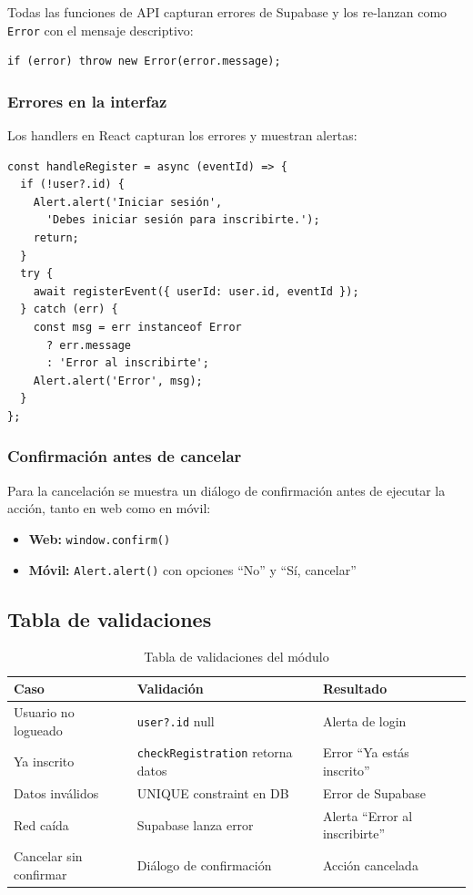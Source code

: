 Todas las funciones de API capturan errores de Supabase y los
re-lanzan como \texttt{Error} con el mensaje descriptivo:

\begin{verbatim}
if (error) throw new Error(error.message);
\end{verbatim}

\subsubsection*{Errores en la interfaz}

Los handlers en React capturan los errores y muestran alertas:

\begin{verbatim}
const handleRegister = async (eventId) => {
  if (!user?.id) {
    Alert.alert('Iniciar sesión',
      'Debes iniciar sesión para inscribirte.');
    return;
  }
  try {
    await registerEvent({ userId: user.id, eventId });
  } catch (err) {
    const msg = err instanceof Error
      ? err.message
      : 'Error al inscribirte';
    Alert.alert('Error', msg);
  }
};
\end{verbatim}

\subsubsection*{Confirmaci\'on antes de cancelar}

Para la cancelaci\'on se muestra un di\'alogo de confirmaci\'on
antes de ejecutar la acci\'on, tanto en web como en m\'ovil:

\begin{itemize}
  \item \textbf{Web:} \texttt{window.confirm()}
  \item \textbf{M\'ovil:} \texttt{Alert.alert()} con opciones
    ``No'' y ``S\'i, cancelar''
\end{itemize}

\subsection{Tabla de validaciones}

\begin{table}[H]
\centering
\begin{tabular}{@{}lp{4cm}p{4cm}@{}}
\toprule
\textbf{Caso} & \textbf{Validaci\'on} & \textbf{Resultado} \\
\midrule
Usuario no logueado & \texttt{user?.id} null & Alerta de login \\
Ya inscrito & \texttt{checkRegistration} retorna datos & Error
  ``Ya est\'as inscrito'' \\
Datos inv\'alidos & UNIQUE constraint en DB & Error de Supabase \\
Red ca\'ida & Supabase lanza error & Alerta ``Error al
  inscribirte'' \\
Cancelar sin confirmar & Di\'alogo de confirmaci\'on & Acci\'on
  cancelada \\
\bottomrule
\end{tabular}
\caption{Tabla de validaciones del m\'odulo}
\end{table}
